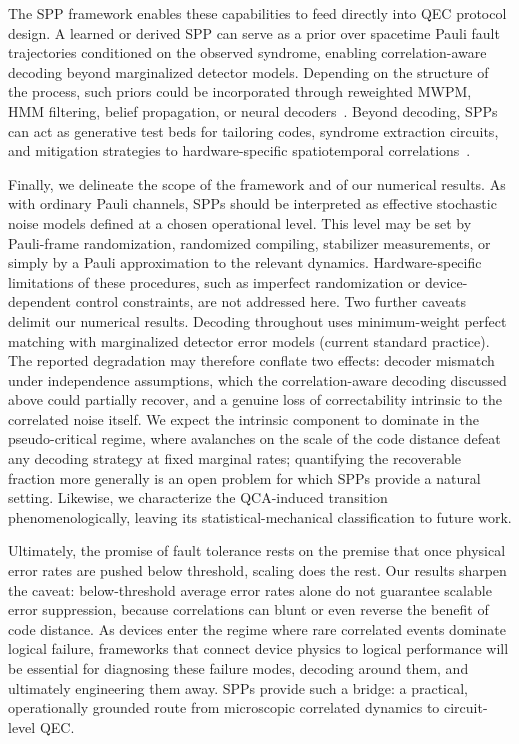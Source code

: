\documentclass[
    aps,
    prx,
    reprint,
    superscriptaddress,
    longbibliography,
    nofootinbib,
    floatfix,
]{revtex4-2}
\begin{document}
The SPP framework enables these capabilities to feed directly into QEC protocol design. A learned or derived SPP can serve as a prior over spacetime Pauli fault trajectories conditioned on the observed syndrome, enabling correlation-aware decoding beyond marginalized detector models. Depending on the structure of the process, such priors could be incorporated through reweighted MWPM, HMM filtering, belief propagation, or neural decoders~\cite{nickersonAnalysingCorrelatedNoise2019,sivakOptimizationDecoderPriors2024,nayakIterativeDecodingStabilizer2026,bauschLearningHighaccuracyError2024,gicevFullyConvolutional3D2025}. Beyond decoding, SPPs can act as generative test beds for tailoring codes, syndrome extraction circuits, and mitigation strategies to hardware-specific spatiotemporal correlations~\cite{tanggaraStrategicCodeUnified2024,mcewenRelaxingHardwareRequirements2023,debroyLUCISurfaceCode2025}.

Finally, we delineate the scope of the framework and of our numerical results. As with ordinary Pauli channels, SPPs should be interpreted as effective stochastic noise models defined at a chosen operational level. This level may be set by Pauli-frame randomization, randomized compiling, stabilizer measurements, or simply by a Pauli approximation to the relevant dynamics. Hardware-specific limitations of these procedures, such as imperfect randomization or device-dependent control constraints, are not addressed here. Two further caveats delimit our numerical results. Decoding throughout uses minimum-weight perfect matching with marginalized detector error models (current standard practice). The reported degradation may therefore conflate two effects: decoder mismatch under independence assumptions, which the correlation-aware decoding discussed above could partially recover, and a genuine loss of correctability intrinsic to the correlated noise itself. We expect the intrinsic component to dominate in the pseudo-critical regime, where avalanches on the scale of the code distance defeat any decoding strategy at fixed marginal rates; quantifying the recoverable fraction more generally is an open problem for which SPPs provide a natural setting. Likewise, we characterize the QCA-induced transition phenomenologically, leaving its statistical-mechanical classification to future work.

Ultimately, the promise of fault tolerance rests on the premise that once physical error rates are pushed below threshold, scaling does the rest. Our results sharpen the caveat: below-threshold average error rates alone do not guarantee scalable error suppression, because correlations can blunt or even reverse the benefit of code distance. As devices enter the regime where rare correlated events dominate logical failure, frameworks that connect device physics to logical performance will be essential for diagnosing these failure modes, decoding around them, and ultimately engineering them away. SPPs provide such a bridge: a practical, operationally grounded route from microscopic correlated dynamics to circuit-level QEC.
\end{document}
